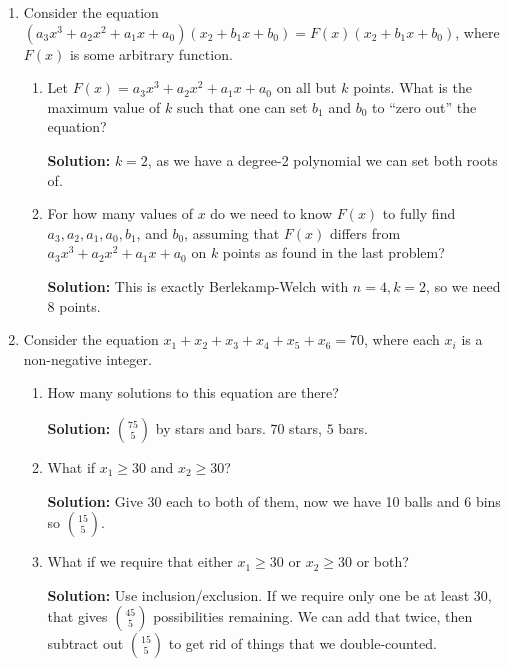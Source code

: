 \documentclass{article}
\newenvironment{solution}{

            \color{blue} \smallskip \textbf{Solution:}}{}
\begin{document}
\begin{enumerate}
\begin{enumerate}
\begin{solution}
                we get our answer.
            \end{solution}
        \end{enumerate}
        \item Consider the equation $(a_3x^3 + a_2x^2 + a_1x + a_0)(x_2 + b_1x + b_0) = F(x)(x_2 + b_1x + b_0)$, where $F(x)$ is some arbitrary function.
        \begin{enumerate}
            \item Let $F(x) = a_3x^3 + a_2x^2 + a_1x + a_0$ on all but $k$ points. What is the maximum value of $k$ such that one can set $b_1$ and $b_0$ to
            ``zero out'' the equation?
            \begin{solution}
                $k=2$, as we have a degree-2 polynomial we can set both roots of.
            \end{solution}
            \item For how many values of $x$ do we need to know $F(x)$ to fully find $a_3, a_2, a_1, a_0, b_1$, and $b_0$, assuming that $F(x)$ differs from
            $a_3x^3 + a_2x^2 + a_1x + a_0$ on $k$ points as found in the last problem?
            \begin{solution}
                This is exactly Berlekamp-Welch with $n=4, k=2$, so we need $8$ points.
            \end{solution}
        \end{enumerate}
        \item Consider the equation $x_1 + x_2 + x_3 + x_4 + x_5 + x_6 = 70$, where each $x_i$ is a non-negative integer.
        \begin{enumerate}
            \item How many solutions to this equation are there?
            \begin{solution}
                ${75 \choose 5}$ by stars and bars. $70$ stars, $5$ bars.
            \end{solution}
            \item What if $x_1 \geq 30$ and $x_2 \geq 30$?
            \begin{solution}
                Give 30 each to both of them, now we have 10 balls and 6 bins so ${15 \choose 5}$.
            \end{solution}
            \item What if we require that either $x_1 \geq 30$ or $x_2 \geq 30$ or both?
            \begin{solution}
                Use inclusion/exclusion. If we require only one be at least 30, that gives ${45 \choose 5}$ possibilities remaining. We can add that twice, then
                subtract out ${15 \choose 5}$ to get rid of things that we double-counted.
            \end{solution}
        \end{enumerate}
    \end{enumerate}
    
\end{document}
